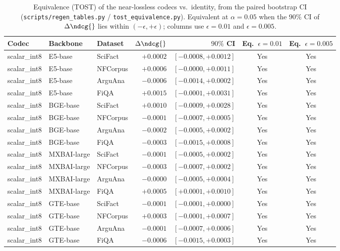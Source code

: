 \begin{table}[t]
\centering
\small
\caption{Equivalence (TOST) of the near-lossless codecs vs.\ identity, from the paired bootstrap CI (\texttt{scripts/regen\_tables.py} / \texttt{tost\_equivalence.py}). Equivalent at $\alpha{=}0.05$ when the $90\%$ CI of $\Delta\ndcg{}$ lies within $(-\epsilon,+\epsilon)$; columns use $\epsilon{=}0.01$ and $\epsilon{=}0.005$.}
\label{tab:tost}
\begin{tabular}{lllrrcc}
\toprule
Codec & Backbone & Dataset & $\Delta\ndcg{}$ & $90\%$ CI & Eq.\ $\epsilon{=}0.01$ & Eq.\ $\epsilon{=}0.005$ \\
\midrule
scalar\_int8 & E5-base & SciFact & $+0.0002$ & $[-0.0008,+0.0012]$ & Yes & Yes \\
scalar\_int8 & E5-base & NFCorpus & $+0.0006$ & $[-0.0000,+0.0011]$ & Yes & Yes \\
scalar\_int8 & E5-base & ArguAna & $-0.0006$ & $[-0.0014,+0.0002]$ & Yes & Yes \\
scalar\_int8 & E5-base & FiQA & $+0.0015$ & $[-0.0001,+0.0031]$ & Yes & Yes \\
scalar\_int8 & BGE-base & SciFact & $+0.0010$ & $[-0.0009,+0.0028]$ & Yes & Yes \\
scalar\_int8 & BGE-base & NFCorpus & $-0.0001$ & $[-0.0007,+0.0005]$ & Yes & Yes \\
scalar\_int8 & BGE-base & ArguAna & $-0.0002$ & $[-0.0005,+0.0002]$ & Yes & Yes \\
scalar\_int8 & BGE-base & FiQA & $-0.0003$ & $[-0.0015,+0.0008]$ & Yes & Yes \\
scalar\_int8 & MXBAI-large & SciFact & $-0.0001$ & $[-0.0005,+0.0002]$ & Yes & Yes \\
scalar\_int8 & MXBAI-large & NFCorpus & $-0.0003$ & $[-0.0007,+0.0002]$ & Yes & Yes \\
scalar\_int8 & MXBAI-large & ArguAna & $-0.0000$ & $[-0.0005,+0.0004]$ & Yes & Yes \\
scalar\_int8 & MXBAI-large & FiQA & $+0.0005$ & $[+0.0001,+0.0010]$ & Yes & Yes \\
scalar\_int8 & GTE-base & SciFact & $-0.0001$ & $[-0.0001,+0.0000]$ & Yes & Yes \\
scalar\_int8 & GTE-base & NFCorpus & $+0.0003$ & $[-0.0001,+0.0007]$ & Yes & Yes \\
scalar\_int8 & GTE-base & ArguAna & $-0.0001$ & $[-0.0007,+0.0006]$ & Yes & Yes \\
scalar\_int8 & GTE-base & FiQA & $-0.0006$ & $[-0.0015,+0.0003]$ & Yes & Yes \\

\end{tabular}
\end{table}
